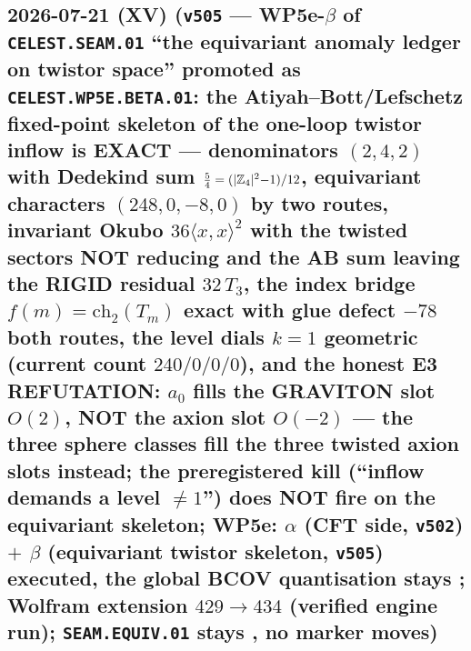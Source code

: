 \subsection*{2026-07-21 (XV) (\texttt{v505} --- WP5e-$\beta$ of \texttt{CELEST.SEAM.01} ``the equivariant anomaly ledger on twistor space'' promoted as \texttt{CELEST.WP5E.BETA.01}: the Atiyah--Bott/Lefschetz fixed-point skeleton of the one-loop twistor inflow is EXACT --- denominators $(2,4,2)$ with Dedekind sum $\tfrac54=(|\mathbb{Z}_4|^2{-}1)/12$, equivariant characters $(248,0,-8,0)$ by two routes, invariant Okubo $36\langle x,x\rangle^2$ with the twisted sectors NOT reducing and the AB sum leaving the RIGID residual $32\,T_3$, the index bridge $f(m)=\mathrm{ch}_2(T_m)$ exact with glue defect $-78$ both routes, the level dials $k=1$ geometric (current count $240/0/0/0$), and the honest E3 REFUTATION: $a_0$ fills the GRAVITON slot $O(2)$, NOT the axion slot $O(-2)$ --- the three sphere classes fill the three twisted axion slots instead; the preregistered kill (``inflow demands a level $\neq1$'') does NOT fire on the equivariant skeleton; WP5e: $\alpha$ (CFT side, \texttt{v502}) $+$ $\beta$ (equivariant twistor skeleton, \texttt{v505}) executed, the global BCOV quantisation stays \mO; Wolfram extension $429\to434$ (verified engine run); \texttt{SEAM.EQUIV.01} stays \mO, no marker moves)}

